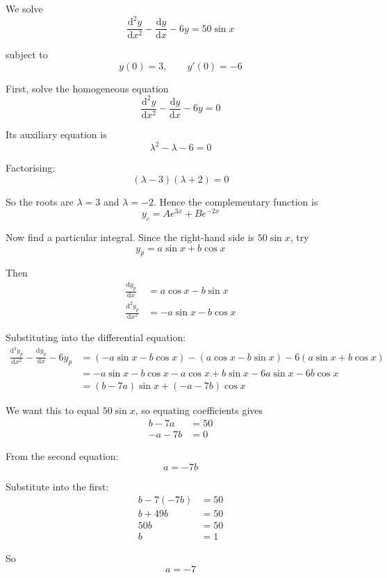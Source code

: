 \documentclass[leqno]{article}
\begin{document}
\begin{enumerate}[
  label=\textbf{\arabic*.},
  leftmargin=*,
  topsep=0pt,
  partopsep=0pt,
  parsep=0pt
]
\vspace*{10pt}

\begin{djsSolution}
We solve
\[
\frac{\mathrm{d}^2y}{\mathrm{d}x^2}-\frac{\mathrm{d}y}{\mathrm{d}x}-6y=50\sin x
\]

subject to
\[
y(0)=3, \qquad y'(0)=-6
\]

First, solve the homogeneous equation
\[
\frac{\mathrm{d}^2y}{\mathrm{d}x^2}-\frac{\mathrm{d}y}{\mathrm{d}x}-6y=0
\]

Its auxiliary equation is
\[
\lambda^2-\lambda-6=0
\]

Factorising:
\[
(\lambda-3)(\lambda+2)=0
\]

So the roots are \(\lambda=3\) and \(\lambda=-2\). Hence the complementary function is
\[
y_c=Ae^{3x}+Be^{-2x}
\]

Now find a particular integral. Since the right-hand side is \(50\sin x\), try
\[
y_p=a\sin x+b\cos x
\]

Then
\begin{align*}
\frac{\mathrm{d}y_p}{\mathrm{d}x} &= a\cos x-b\sin x \\
\frac{\mathrm{d}^2y_p}{\mathrm{d}x^2} &= -a\sin x-b\cos x
\end{align*}

Substituting into the differential equation:
\begin{align*}
\frac{\mathrm{d}^2y_p}{\mathrm{d}x^2}-\frac{\mathrm{d}y_p}{\mathrm{d}x}-6y_p
&=\left(-a\sin x-b\cos x\right)-\left(a\cos x-b\sin x\right)-6\left(a\sin x+b\cos x\right) \\
&=-a\sin x-b\cos x-a\cos x+b\sin x-6a\sin x-6b\cos x \\
&=(b-7a)\sin x+(-a-7b)\cos x
\end{align*}

We want this to equal \(50\sin x\), so equating coefficients gives
\begin{align*}
b-7a&=50 \\
-a-7b&=0
\end{align*}

From the second equation:
\[
a=-7b
\]

Substitute into the first:
\begin{align*}
b-7(-7b)&=50 \\
b+49b&=50 \\
50b&=50 \\
b&=1
\end{align*}

So
\[
a=-7
\]


\end{djsSolution}
\end{enumerate}
\end{document}
